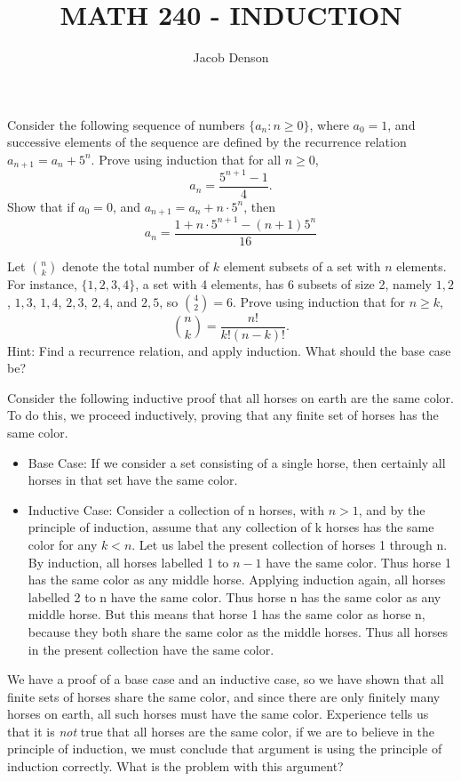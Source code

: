 \documentclass{exam}
\title{MATH 240 - INDUCTION}
\author{Jacob Denson}
\begin{document}
\pagestyle{headandfoot}
\runningfooter{}{}{}
\firstpageheadrule

\begin{questions}

\maketitle

\question Consider the following sequence of numbers $\{ a_n : n \geq 0 \}$, where $a_0 = 1$, and successive elements of the sequence are defined by the recurrence relation $a_{n+1} = a_n + 5^n$. Prove using induction that for all $n \geq 0$,
%
\[ a_n = \frac{5^{n+1} - 1}{4}. \]
%
Show that if $a_0 = 0$, and $a_{n+1} = a_n + n \cdot 5^n$, then
%
\[ a_n = \frac{1 + n \cdot 5^{n+1} - (n+1) 5^n}{16} \]
\vspace{8em}

\question Let ${n \choose k}$ denote the total number of $k$ element subsets of a set with $n$ elements. For instance, $\{ 1, 2, 3, 4 \}$, a set with 4 elements, has 6 subsets of size 2, namely ${1,2}$, ${1,3}$, ${1,4}$, ${2,3}$, ${2,4}$, and ${2,5}$, so ${4 \choose 2} = 6$. Prove using induction that for $n \geq k$,
%
\[ {n \choose k} = \frac{n!}{k!(n-k)!}. \] 
%
Hint: Find a recurrence relation, and apply induction. What should the base case be?
\vspace{8em}

\question Consider the following inductive proof that all horses on earth are the same color. To do this, we proceed inductively, proving that any finite set of horses has the same color.
\begin{itemize}
	\item Base Case: If we consider a set consisting of a single horse, then certainly all horses in that set have the same color.
	\item Inductive Case: Consider a collection of n horses, with $n > 1$, and by the principle of induction, assume that any collection of k horses has the same color for any $k < n$. Let us label the present collection of horses 1 through n. By induction, all horses labelled 1 to $n-1$ have the same color. Thus horse 1 has the same color as any middle horse. Applying induction again, all horses labelled 2 to n have the same color. Thus horse n has the same color as any middle horse. But this means that horse 1 has the same color as horse n, because they both share the same color as the middle horses. Thus all horses in the present collection have the same color.
\end{itemize}
%
We have a proof of a base case and an inductive case, so we have shown that all finite sets of horses share the same color, and since there are only finitely many horses on earth, all such horses must have the same color. Experience tells us that it is \emph{not} true that all horses are the same color, if we are to believe in the principle of induction, we must conclude that argument is using the principle of induction correctly.  What is the problem with this argument?


\end{questions}
\end{document}

